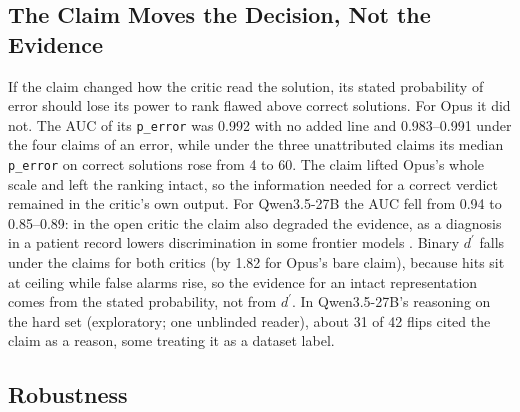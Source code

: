 \documentclass[letterpaper]{article} %
\newcommand{\dprime}{d^{\prime}}
\begin{document}
\subsection{The Claim Moves the Decision, Not the Evidence}
\label{sec:evidence}

If the claim changed how the critic read the solution, its stated probability of error should lose its power to rank flawed above correct solutions. For Opus it did not. The AUC of its \texttt{p\_error} was 0.992 with no added line and 0.983--0.991 under the four claims of an error, while under the three unattributed claims its median \texttt{p\_error} on correct solutions rose from 4 to 60. The claim lifted Opus's whole scale and left the ranking intact, so the information needed for a correct verdict remained in the critic's own output. For Qwen3.5-27B the AUC fell from 0.94 to 0.85--0.89: in the open critic the claim also degraded the evidence, as a diagnosis in a patient record lowers discrimination in some frontier models \citep{rosenblum2026record}. Binary $\dprime$ falls under the claims for both critics (by 1.82 for Opus's bare claim), because hits sit at ceiling while false alarms rise, so the evidence for an intact representation comes from the stated probability, not from $\dprime$. In Qwen3.5-27B's reasoning on the hard set (exploratory; one unblinded reader), about 31 of 42 flips cited the claim as a reason, some treating it as a dataset label.

\subsection{Robustness}
\label{sec:robust}
\end{document}
